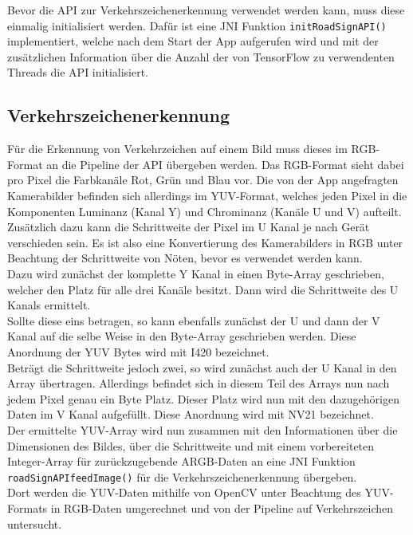 \documentclass[12pt,a4paper,ngerman,enabledeprecatedfontcommands]{scrreprt}
\begin{document}
Bevor die API zur Verkehrszeichenerkennung verwendet werden kann, muss diese einmalig initialisiert werden. Dafür ist eine JNI Funktion \texttt{initRoadSignAPI()} implementiert, welche nach dem Start der App aufgerufen wird und mit der zusätzlichen Information über die Anzahl der von TensorFlow zu verwendenten Threads die API initialisiert.\\

\subsection{Verkehrszeichenerkennung}

Für die Erkennung von Verkehrzeichen auf einem Bild muss dieses im RGB-Format an die Pipeline der API übergeben werden. Das RGB-Format sieht dabei pro Pixel die Farbkanäle Rot, Grün und Blau vor.
Die von der App angefragten Kamerabilder befinden sich allerdings im YUV-Format, welches jeden Pixel in die Komponenten Luminanz (Kanal Y) und Chrominanz (Kanäle U und V) aufteilt. Zusätzlich dazu kann die Schrittweite der Pixel im U Kanal je nach Gerät verschieden sein.
Es ist also eine Konvertierung des Kamerabilders in RGB unter Beachtung der Schrittweite von Nöten, bevor es verwendet werden kann.\\
Dazu wird zunächst der komplette Y Kanal in einen Byte-Array geschrieben, welcher den Platz für alle drei Kanäle besitzt. Dann wird die Schrittweite des U Kanals ermittelt.\\
Sollte diese eins betragen, so kann ebenfalls zunächst der U und dann der V Kanal auf die selbe Weise in den Byte-Array geschrieben werden. Diese Anordnung der YUV Bytes wird mit I420 bezeichnet.\\
Beträgt die Schrittweite jedoch zwei, so wird zunächst auch der U Kanal in den Array übertragen. Allerdings befindet sich in diesem Teil des Arrays nun nach jedem Pixel genau ein Byte Platz. Dieser Platz wird nun mit den dazugehörigen Daten im V Kanal aufgefüllt. Diese Anordnung wird mit NV21 bezeichnet.\\
Der ermittelte YUV-Array wird nun zusammen mit den Informationen über die Dimensionen des Bildes, über die Schrittweite und mit einem vorbereiteten Integer-Array für zurückzugebende ARGB-Daten an eine JNI Funktion \texttt{roadSignAPIfeedImage()} für die Verkehrszeichenerkennung übergeben.\\
Dort werden die YUV-Daten mithilfe von OpenCV unter Beachtung des YUV-Formats in RGB-Daten umgerechnet und von der Pipeline auf Verkehrszeichen untersucht.\\
\end{document}
